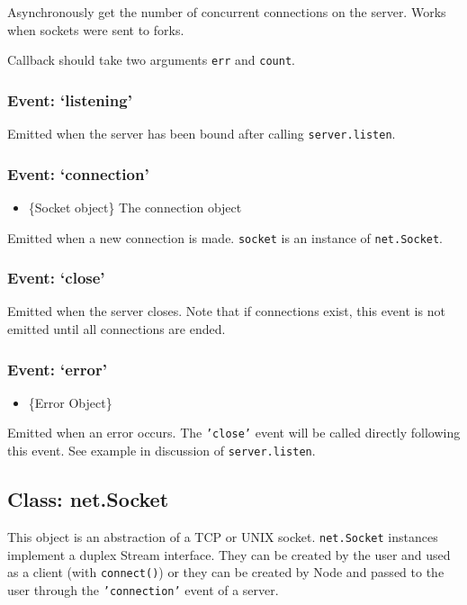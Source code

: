 Asynchronously get the number of concurrent connections on the server.
Works when sockets were sent to forks.

Callback should take two arguments \texttt{err} and \texttt{count}.

\subsubsection{Event: `listening'}

Emitted when the server has been bound after calling
\texttt{server.listen}.

\subsubsection{Event: `connection'}

\begin{itemize}
\item
  \{Socket object\} The connection object
\end{itemize}

Emitted when a new connection is made. \texttt{socket} is an instance of
\texttt{net.Socket}.

\subsubsection{Event: `close'}

Emitted when the server closes. Note that if connections exist, this
event is not emitted until all connections are ended.

\subsubsection{Event: `error'}

\begin{itemize}
\item
  \{Error Object\}
\end{itemize}

Emitted when an error occurs. The \texttt{'close'} event will be called
directly following this event. See example in discussion of
\texttt{server.listen}.

\subsection{Class: net.Socket}

This object is an abstraction of a TCP or UNIX socket.
\texttt{net.Socket} instances implement a duplex Stream interface. They
can be created by the user and used as a client (with
\texttt{connect()}) or they can be created by Node and passed to the
user through the \texttt{'connection'} event of a server.


